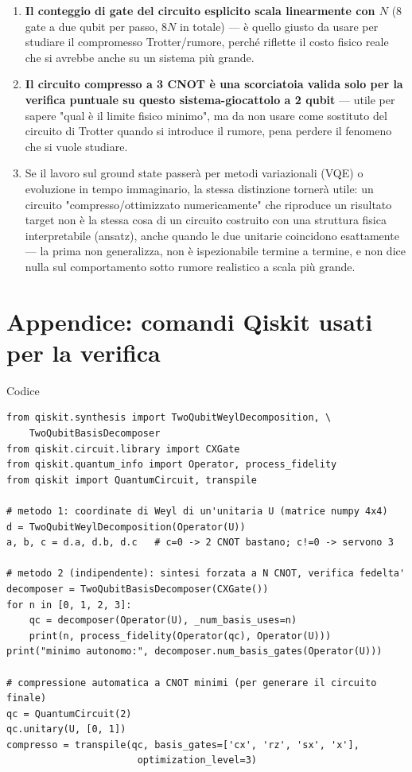 \documentclass[11pt,a4paper]{article}
\begin{document}
\begin{enumerate}[leftmargin=1.4em,itemsep=0.3em]
\item \textbf{Il conteggio di gate del circuito esplicito scala
linearmente con $N$} (8 gate a due qubit per passo, $8N$ in totale) ---
è quello giusto da usare per studiare il compromesso Trotter/rumore,
perché riflette il costo fisico reale che si avrebbe anche su un
sistema più grande.
\item \textbf{Il circuito compresso a 3 CNOT è una scorciatoia valida
solo per la verifica puntuale su questo sistema-giocattolo a 2 qubit}
--- utile per sapere "qual è il limite fisico minimo", ma da non usare
come sostituto del circuito di Trotter quando si introduce il rumore,
pena perdere il fenomeno che si vuole studiare.
\item Se il lavoro sul ground state passerà per metodi variazionali
(VQE) o evoluzione in tempo immaginario, la stessa distinzione tornerà
utile: un circuito "compresso/ottimizzato numericamente" che riproduce
un risultato target non è la stessa cosa di un circuito costruito con
una struttura fisica interpretabile (ansatz), anche quando le due
unitarie coincidono esattamente --- la prima non generalizza, non è
ispezionabile termine a termine, e non dice nulla sul comportamento
sotto rumore realistico a scala più grande.
\end{enumerate}

\section*{Appendice: comandi Qiskit usati per la verifica}

\begin{panelbox}{Codice}
\small
\begin{verbatim}
from qiskit.synthesis import TwoQubitWeylDecomposition, \
    TwoQubitBasisDecomposer
from qiskit.circuit.library import CXGate
from qiskit.quantum_info import Operator, process_fidelity
from qiskit import QuantumCircuit, transpile

# metodo 1: coordinate di Weyl di un'unitaria U (matrice numpy 4x4)
d = TwoQubitWeylDecomposition(Operator(U))
a, b, c = d.a, d.b, d.c   # c=0 -> 2 CNOT bastano; c!=0 -> servono 3

# metodo 2 (indipendente): sintesi forzata a N CNOT, verifica fedelta'
decomposer = TwoQubitBasisDecomposer(CXGate())
for n in [0, 1, 2, 3]:
    qc = decomposer(Operator(U), _num_basis_uses=n)
    print(n, process_fidelity(Operator(qc), Operator(U)))
print("minimo autonomo:", decomposer.num_basis_gates(Operator(U)))

# compressione automatica a CNOT minimi (per generare il circuito finale)
qc = QuantumCircuit(2)
qc.unitary(U, [0, 1])
compresso = transpile(qc, basis_gates=['cx', 'rz', 'sx', 'x'],
                       optimization_level=3)
\end{verbatim}
\end{panelbox}
\end{document}

